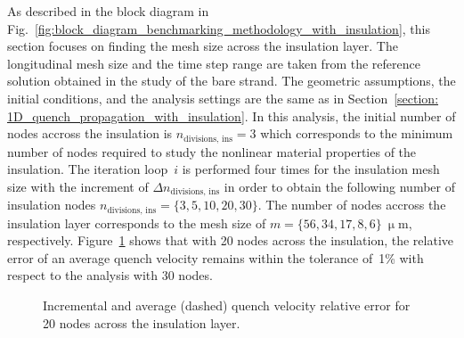 
As described in the block diagram in Fig.~\ref{fig:block_diagram_benchmarking_methodology_with_insulation}, this section focuses on finding the mesh size across the insulation layer. The longitudinal mesh size and the time step range are taken from the reference solution obtained in the study of the bare strand. The geometric assumptions, the initial conditions, and the analysis settings are the same as in Section~\ref{section: 1D_quench_propagation_with_insulation}. In this analysis, the initial number of nodes accross the insulation is $n_\text{divisions, ins}=3$ which corresponds to the minimum number of nodes required to study the nonlinear material properties of the insulation. The iteration loop~$i$ is performed four times for the insulation mesh size with the increment of $\Delta n_\text{divisions, ins}$ in order to obtain the following number of insulation nodes $n_\text{divisions, ins}=\{3, 5, 10, 20, 30\}$. The number of nodes accross the insulation layer corresponds to the mesh size of $m=\{56, 34, 17, 8, 6\}~\upmu \text{m}$, respectively. Figure~\ref{fig: q_vel_modelling_v_quench_rel_error_with_insulation} shows that with 20 nodes across the insulation, the relative error of an average quench velocity remains within the tolerance of~1\% with respect to the analysis with 30 nodes. 

\begin{figure}[H]
\centering
    \caption{Incremental and average (dashed) quench velocity relative error for 20 nodes across the insulation layer.}
    \label{fig: q_vel_modelling_v_quench_rel_error_with_insulation}
\end{figure}

